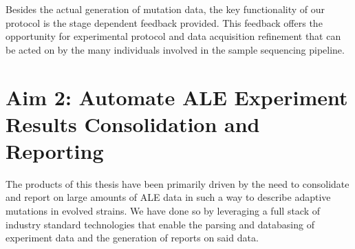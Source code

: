 \documentclass[12pt,final,masters,chapterheads]{ucsd}  %
\begin{document}
Besides the actual generation of mutation data, the key functionality of our protocol is the stage dependent feedback provided. This feedback offers the opportunity for experimental protocol and data acquisition refinement that can be acted on by the many individuals involved in the sample sequencing pipeline.

%
%
%
%

\chapter{Aim 2: Automate ALE Experiment Results Consolidation and Reporting}

%
%



The products of this thesis have been primarily driven by the need to consolidate and report on large amounts of ALE data in such a way to describe adaptive mutations in evolved strains. We have done so by leveraging a full stack of industry standard technologies that enable the parsing and databasing of experiment data and the generation of reports on said data.
\end{document}
